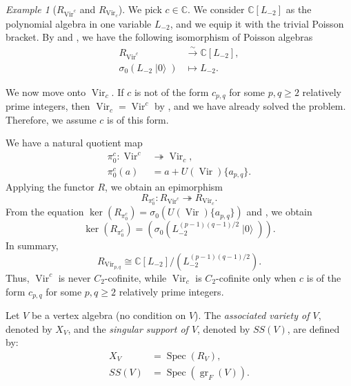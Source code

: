 \documentclass[a4paper, 12pt, reqno]{amsart}
\theoremstyle{remark}
\newtheorem{example}[theorem]{Example}
\DeclareMathOperator{\Vir}{Vir}
\DeclareMathOperator{\gr}{gr}
\DeclareMathOperator{\vac}{|0\rangle}
\DeclareMathOperator{\Spec}{Spec}
\begin{document}
\begin{example}[$R_{\Vir^c}$ and $R_{\Vir_c}$]
  \label{exa:16}
  We pick $c \in \mathbb{C}$.
  We consider $\mathbb{C}[L_{-2}]$ as the polynomial algebra in one variable $L_{-2}$, and we equip it with the trivial Poisson bracket.
  By  and , we have the following isomorphism of Poisson algebras
  \begin{align*}
    R_{\Vir^c} &\xrightarrow{\sim} \mathbb{C}[L_{-2}], \\
    \sigma_0(L_{-2}\vac) &\mapsto L_{-2}.
  \end{align*}

  We now move onto $\Vir_c$.
  If $c$ is not of the form $c_{p, q}$ for some $p, q \ge 2$ relatively prime integers, then $\Vir_c = \Vir^c$ by , and we have already solved the problem.
  Therefore, we assume $c$ is of this form.

  We have a natural quotient map
  \begin{align*}
    \pi^c_0: \Vir^c &\twoheadrightarrow \Vir_c, \\
    \pi^c_0(a) &= a + U(\Vir)\{a_{p, q}\}.
  \end{align*}
  Applying the functor $R$, we obtain an epimorphism
  \begin{equation*}
    R_{\pi^c_0}: R_{\Vir^c} \twoheadrightarrow R_{\Vir_c}.
  \end{equation*}
  From the equation $\ker(R_{\pi^c_0}) = \sigma_0(U(\Vir)\{a_{p, q}\})$ and , we obtain
  \begin{equation*}
    \ker(R_{\pi^c_0}) = (\sigma_0(L_{-2}^{(p - 1)(q - 1)/2}\vac)).
  \end{equation*}
  In summary,
  \begin{equation*}
    R_{\Vir_{p, q}} \cong \mathbb{C}[L_{-2}]/(L_{-2}^{(p - 1)(q - 1)/2}).
  \end{equation*}
  Thus, $\Vir^c$ is never $C_2$-cofinite, while $\Vir_c$ is $C_2$-cofinite only when $c$ is of the form $c_{p, q}$ for some $p, q \ge 2$ relatively prime integers.
\end{example}

Let $V$ be a vertex algebra (no condition on $V$).
The \emph{associated variety of $V$}, denoted by $X_V$, and the \emph{singular support of $V$}, denoted by $SS(V)$, are defined by:
\begin{align*}
  X_V &= \Spec(R_V), \\
  SS(V) &= \Spec(\gr_F(V)).
\end{align*}
\end{document}
